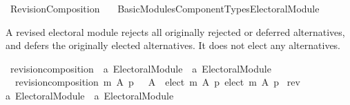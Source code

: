%
\begin{isabellebody}%
%
%
\isadelimdocument
\isanewline
%
\endisadelimdocument
%
\isatagdocument
\isanewline
\isanewline
%
\isamarkuptrue%
%
\endisatagdocument
{\isafolddocument}%
%
\isadelimdocument
%
\endisadelimdocument
%
\isadelimtheory
%
\endisadelimtheory
%
\isatagtheory
{}\isamarkupfalse%
\ Revision{\isacharunderscore}{\kern0pt}Composition\isanewline
\ \ \ {\isachardoublequoteopen}Basic{\isacharunderscore}{\kern0pt}Modules{\isacharslash}{\kern0pt}Component{\isacharunderscore}{\kern0pt}Types{\isacharslash}{\kern0pt}Electoral{\isacharunderscore}{\kern0pt}Module{\isachardoublequoteclose}\isanewline
{}%
\endisatagtheory
{\isafoldtheory}%
%
\isadelimtheory
%
\endisadelimtheory
%
\begin{isamarkuptext}%
A revised electoral module rejects all originally rejected or deferred
alternatives, and defers the originally elected alternatives.
It does not elect any alternatives.%
\end{isamarkuptext}\isamarkuptrue%
%
\isadelimdocument
%
\endisadelimdocument
%
\isatagdocument
%
\isamarkuptrue%
%
\endisatagdocument
{\isafolddocument}%
%
\isadelimdocument
%
\endisadelimdocument
{}\isamarkupfalse%
\ revision{\isacharunderscore}{\kern0pt}composition\ {\isacharcolon}{\kern0pt}{\isacharcolon}{\kern0pt}\ {\isachardoublequoteopen}{\isacharprime}{\kern0pt}a\ Electoral{\isacharunderscore}{\kern0pt}Module\ {\isasymRightarrow}\ {\isacharprime}{\kern0pt}a\ Electoral{\isacharunderscore}{\kern0pt}Module{\isachardoublequoteclose}\ \isanewline
\ \ {\isachardoublequoteopen}revision{\isacharunderscore}{\kern0pt}composition\ m\ A\ p\ {\isacharequal}{\kern0pt}\ {\isacharparenleft}{\kern0pt}{\isacharbraceleft}{\kern0pt}{\isacharbraceright}{\kern0pt}{\isacharcomma}{\kern0pt}\ A\ {\isacharminus}{\kern0pt}\ elect\ m\ A\ p{\isacharcomma}{\kern0pt}\ elect\ m\ A\ p{\isacharparenright}{\kern0pt}{\isachardoublequoteclose}\isanewline
\isanewline
{}\isamarkupfalse%
\ rev\ {\isacharcolon}{\kern0pt}{\isacharcolon}{\kern0pt}\isanewline
{\isachardoublequoteopen}{\isacharprime}{\kern0pt}a\ Electoral{\isacharunderscore}{\kern0pt}Module\ {\isasymRightarrow}\ {\isacharprime}{\kern0pt}a\ Electoral{\isacharunderscore}{\kern0pt}Module{\isachardoublequoteclose}\ {\isacharparenleft}{\kern0pt}{\isachardoublequoteopen}{\isacharunderscore}{\kern0pt}{\isasymdown}{\isachardoublequoteclose}\ {}{}{\isacharparenright}{\kern0pt}\ \isanewline

\end{isabellebody}
